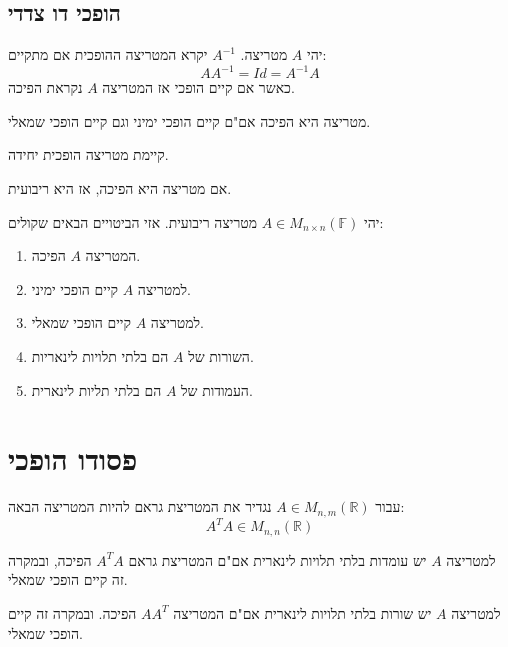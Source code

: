 \documentclass{tstextbook}
\begin{document}
\subsection{הופכי דו צדדי}

\begin{definition}
יהי \(A\) מטריצה. \(A^{-1}\) יקרא המטריצה ההופכית אם מתקיים:
$$AA^{-1}=Id=A^{-1}A$$
כאשר אם קיים הופכי אז המטריצה \(A\) נקראת הפיכה.

\end{definition}
\begin{corollary}
מטריצה היא הפיכה אם"ם קיים הופכי ימיני וגם קיים הופכי שמאלי.

\end{corollary}
\begin{proposition}
קיימת מטריצה הופכית יחידה.

\end{proposition}
\begin{proposition}
אם מטריצה היא הפיכה, אז היא ריבועית.

\end{proposition}
\begin{proposition}
יהי \(A \in M_{n\times n}\left( \mathbb{F}  \right)\) מטריצה ריבועית. אזי הביטויים הבאים שקולים:

  \begin{enumerate}
    \item המטריצה \(A\) הפיכה. 


    \item למטריצה \(A\) קיים הופכי ימיני. 


    \item למטריצה \(A\) קיים הופכי שמאלי. 


    \item השורות של \(A\) הם בלתי תלויות לינאריות. 


    \item העמודות של \(A\) הם בלתי תליות לינארית. 


  \end{enumerate}
\end{proposition}
\section{פסודו הופכי}

\begin{definition}
עבור \(A\in M_{n,m}\left( \mathbb{R} \right)\) נגדיר את המטריצת גראם להיות המטריצה הבאה:
$$A^{T}A \in M_{n,n}\left( \mathbb{R} \right)$$

\end{definition}
\begin{proposition}
למטריצה \(A\) יש עומדות בלתי תלויות לינארית אם"ם המטריצת גראם \(A^{T}A\) הפיכה, ובמקרה זה קיים הופכי שמאלי.

\end{proposition}
\begin{proposition}
למטריצה \(A\) יש שורות בלתי תלויות לינארית אם"ם המטריצה \(AA^{T}\) הפיכה. ובמקרה זה קיים הופכי שמאלי.

\end{proposition}
\end{document}
